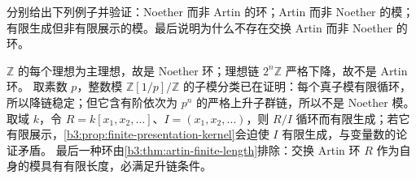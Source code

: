 \begin{exercise}\label{b3:ex:03-noether-artin-distinction}
	分别给出下列例子并验证：Noether 而非 Artin 的环；Artin 而非 Noether 的模；有限生成但非有限展示的模。最后说明为什么不存在交换 Artin 而非 Noether 的环。
\end{exercise}
\begin{solution}
	\(\mathbb Z\) 的每个理想为主理想，故是 Noether 环；理想链 \(2^n\mathbb Z\) 严格下降，故不是 Artin 环。 取素数 \(p\)，整数模 \(\mathbb Z[1/p]/\mathbb Z\) 的子模分类已在证明：每个真子模有限循环，所以降链稳定；但它含有阶依次为 \(p^n\) 的严格上升子群链，所以不是 Noether 模。 取域 \(k\)，令 \(R=k[x_1,x_2,\ldots]\)、\(I=(x_1,x_2,\ldots)\)，则 \(R/I\) 循环而有限生成；若它有限展示，\cref{b3:prop:finite-presentation-kernel}会迫使 \(I\) 有限生成，与变量数的论证矛盾。 最后一种环由\cref{b3:thm:artin-finite-length}排除：交换 Artin 环 \(R\) 作为自身的模具有有限长度，必满足升链条件。
\end{solution}
